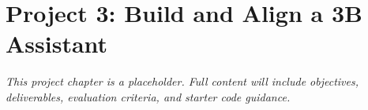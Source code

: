 \chapter*{Project 3: Build and Align a 3B Assistant}
\label{project:assistant}


\textit{This project chapter is a placeholder. Full content will include objectives, deliverables, evaluation criteria, and starter code guidance.}
